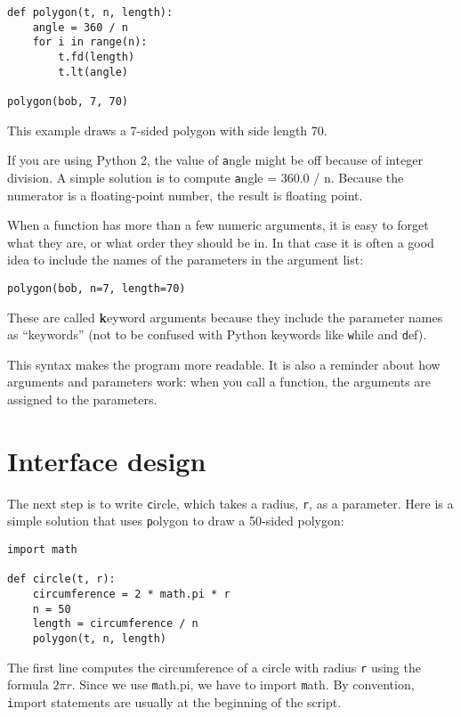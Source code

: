 \documentclass[
DIV=11,
fontsize=13,
twoside,
headinclude=false,
titlepage=firstiscover,
abstract=true,
headsepline=true,
footsepline=true,
chapterprefix=true, %
headings=big,
bibliography=totoc,%
captions=tableheading
]{scrbook}
\theoremstyle{definition}
\begin{document}
\begin{lstlisting}
def polygon(t, n, length):
    angle = 360 / n
    for i in range(n):
        t.fd(length)
        t.lt(angle)

polygon(bob, 7, 70)
\end{lstlisting}
%
This example draws a 7-sided polygon with side length 70.

If you are using Python 2, the value of {\texttt angle} might be off
because of integer division.  A simple solution is to compute
{\texttt angle = 360.0 / n}.  Because the numerator is a floating-point
number, the result is floating point.

When a function has more than a few numeric arguments, it is easy to
forget what they are, or what order they should be in.  In that case
it is often a good idea to include the names of the parameters in the
argument list:

\begin{lstlisting}
polygon(bob, n=7, length=70)
\end{lstlisting}
%
These are called {\textbf keyword arguments} because they include
the parameter names as ``keywords'' (not to be confused with
Python keywords like {\texttt while} and {\texttt def}).

This syntax makes the program more readable.  It is also a reminder
about how arguments and parameters work: when you call a function, the
arguments are assigned to the parameters.


\section{Interface design}

The next step is to write {\texttt circle}, which takes a radius,
{\texttt r}, as a parameter.  Here is a simple solution that uses
{\texttt polygon} to draw a 50-sided polygon:

\begin{lstlisting}
import math

def circle(t, r):
    circumference = 2 * math.pi * r
    n = 50
    length = circumference / n
    polygon(t, n, length)
\end{lstlisting}
%
The first line computes the circumference of a circle with radius
{\texttt r} using the formula $2 \pi r$.  Since we use {\texttt math.pi}, we
have to import {\texttt math}.  By convention, {\texttt import} statements
are usually at the beginning of the script.
\end{document}

